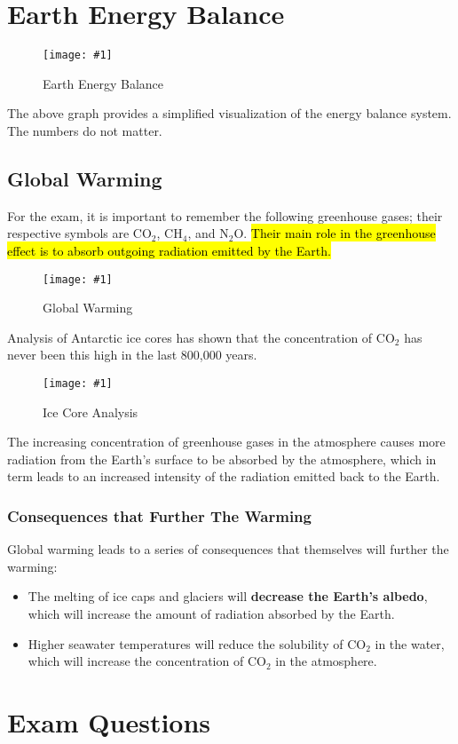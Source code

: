 \documentclass[a4paper,12pt]{article}
\let\oldsection\section
\renewcommand\section{\clearpage\oldsection}
\newcommand{\img}[4]{\begin{center}
  \begin{figure}[H]
    \centering
    \texttt{[image: \#1]}
    \caption{#3}
    \label{fig:#4}
  \end{figure}
\end{center}}
\begin{document}
\section{Earth Energy Balance}

\img{systemsummary.png}{1}{Earth Energy Balance}{systemsummary}

The above graph provides a simplified visualization of the energy balance system. The numbers do not matter.

\pagebreak

\subsection{Global Warming}

For the exam, it is important to remember the following greenhouse gases; their respective symbols are CO$_2$, CH$_4$, and N$_2$O. \hl{Their main role in the greenhouse effect is to absorb outgoing radiation emitted by the Earth.}

\img{env.png}{0.8}{Global Warming}{env}

Analysis of Antarctic ice cores has shown that the concentration of CO$_2$ has never been this high in the last 800,000 years.

\img{icecore.png}{0.7}{Ice Core Analysis}{icecore}

The increasing concentration of greenhouse gases in the atmosphere causes more radiation from the Earth's surface to be absorbed by the atmosphere, which in term leads to an increased intensity of the radiation emitted back to the Earth.

\pagebreak

\subsubsection{Consequences that Further The Warming}

Global warming leads to a series of consequences that themselves will further the warming:
\begin{itemize}
  \item The melting of ice caps and glaciers will \textbf{decrease the Earth's albedo}, which will increase the amount of radiation absorbed by the Earth.
  \item Higher seawater temperatures will reduce the solubility of CO$_2$ in the water, which will increase the concentration of CO$_2$ in the atmosphere.
\end{itemize}

\section{Exam Questions}
\end{document}
